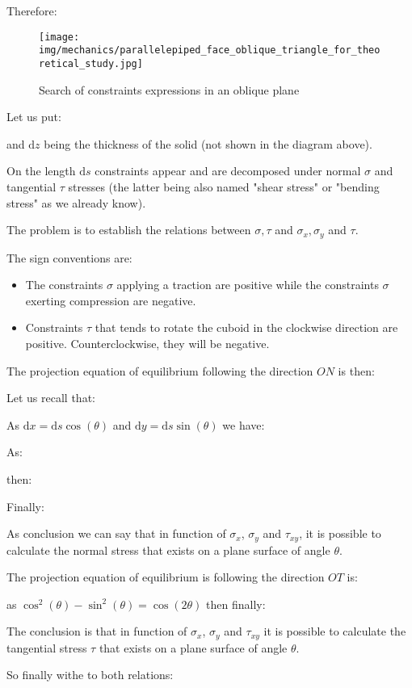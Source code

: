 	Therefore:
	\begin{figure}[H]
		\centering
		\texttt{[image: img/mechanics/parallelepiped\_face\_oblique\_triangle\_for\_theoretical\_study.jpg]}
		\caption[]{Search of constraints expressions in an oblique plane}
	\end{figure}
	Let us put:
	
	and $\mathrm{d}z$ being the thickness of the solid (not shown in the diagram above).

	On the length $\mathrm{d}s$ constraints appear and are decomposed under normal $\sigma$ and tangential $\tau$ stresses (the latter being also named "shear stress" or "bending stress" as we already know).

	The problem is to establish the relations between $\sigma,\tau$ and $\sigma_x,\sigma_y$ and $\tau$.

	The sign conventions are:
	\begin{itemize}
		\item The constraints $\sigma$ applying a traction are positive while the constraints $\sigma$ exerting  compression are negative.
		
		\item Constraints $\tau$ that tends to rotate the cuboid in the clockwise direction are positive. Counterclockwise, they will be negative.
	\end{itemize}
	The projection equation of equilibrium following the direction $ON$ is then:
	
	Let us recall that:
	
	As $\mathrm{d}x=\mathrm{d}s\cos(\theta)$ and $\mathrm{d}y=\mathrm{d}s\sin(\theta)$ we have:
	
	As:
	
	then:
	
	Finally:
	
	As conclusion we can say that in function of $\sigma_x$, $\sigma_y$ and $\tau_{xy}$, it is possible to calculate the normal stress that exists on a plane surface of angle $\theta$.
	
	The projection equation of equilibrium is following the direction $OT$ is:
	
	as $\cos^2(\theta)-\sin^2(\theta)=\cos(2\theta)$ then finally:
	
	The conclusion is that in function of $\sigma_x$, $\sigma_y$ and $\tau_{xy}$ it is possible to calculate the tangential stress $\tau$ that exists on a plane surface of angle $\theta$.
	
	So finally withe to both relations:
	
